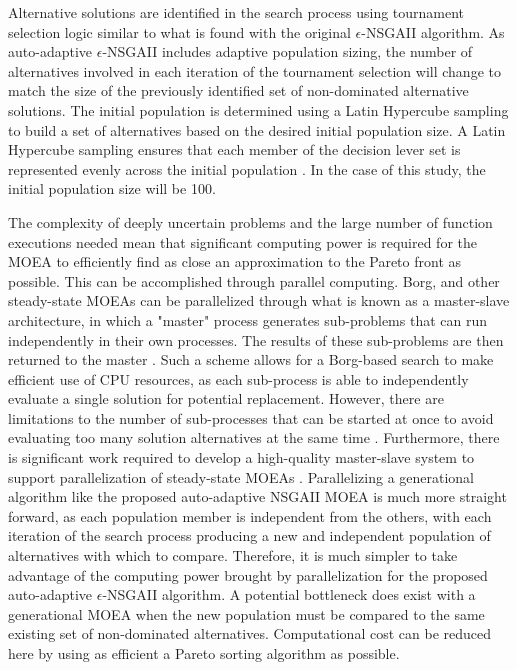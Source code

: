     Alternative solutions are identified in the search process using tournament selection logic similar to what is found with the original $\epsilon$-NSGAII algorithm. As auto-adaptive $\epsilon$-NSGAII includes adaptive population sizing, the number of alternatives involved in each iteration of the tournament selection will change to match the size of the previously identified set of non-dominated alternative solutions. The initial population is determined using a Latin Hypercube sampling to build a set of alternatives based on the desired initial population size. A Latin Hypercube sampling ensures that each member of the decision lever set is represented evenly across the initial population \citep{Mckay1979}. In the case of this study, the initial population size will be 100. 
    
    The complexity of deeply uncertain problems and the large number of function executions needed mean that significant computing power is required for the MOEA to efficiently find as close an approximation to the Pareto front as possible. This can be accomplished through parallel computing. Borg, and other steady-state MOEAs can be parallelized through what is known as a master-slave architecture, in which a "master" process generates sub-problems that can run independently in their own processes. The results of these sub-problems are then returned to the master \citep{Zavoianu2013}. Such a scheme allows for a Borg-based search to make efficient use of CPU resources, as each sub-process is able to independently evaluate a single solution for potential replacement. However, there are limitations to the number of sub-processes that can be started at once to avoid  evaluating too many solution alternatives at the same time \citep{Hadka2013}. Furthermore, there is significant work required to develop a high-quality master-slave system to support parallelization of steady-state MOEAs \citep{Hadka2015Scale}. Parallelizing a generational algorithm like the proposed auto-adaptive NSGAII MOEA is much more straight forward, as each population member is independent from the others, with each iteration of the search process producing a new and independent population of alternatives with which to compare. Therefore, it is much simpler to take advantage of the computing power brought by parallelization for the proposed auto-adaptive $\epsilon$-NSGAII algorithm. A potential bottleneck does exist with a generational MOEA when the new population must be compared to the same existing set of non-dominated alternatives. Computational cost can be reduced here by using as efficient a Pareto sorting algorithm as possible. 
    

